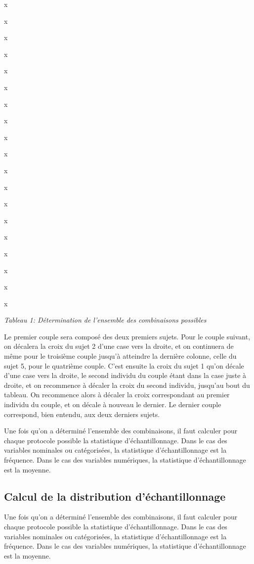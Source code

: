\documentclass[]{book}
\theoremstyle{definition}
\theoremstyle{definition}
\theoremstyle{definition}
\theoremstyle{remark}
\begin{document}
x

x

x

x

x

x

x

x

x

x

x

x

x

x

x

x

x

x

x

\emph{Tableau 1: Détermination de l'ensemble des combinaisons possibles}

Le premier couple sera composé des deux premiers sujets. Pour le couple
suivant, on décalera la croix du sujet 2 d'une case vers la droite, et
on continuera de même pour le troisième couple jusqu'à atteindre la
dernière colonne, celle du sujet 5, pour le quatrième couple. C'est
ensuite la croix du sujet 1 qu'on décale d'une case vers la droite, le
second individu du couple étant dans la case juste à droite, et on
recommence à décaler la croix du second individu, jusqu'au bout du
tableau. On recommence alors à décaler la croix correspondant au premier
individu du couple, et on décale à nouveau le dernier. Le dernier couple
correspond, bien entendu, aux deux derniers sujets.

Une fois qu'on a déterminé l'ensemble des combinaisons, il faut calculer
pour chaque protocole possible la statistique d'échantillonnage. Dans le
cas des variables nominales ou catégorisées, la statistique
d'échantillonnage est la fréquence. Dans le cas des variables
numériques, la statistique d'échantillonnage est la moyenne.

\hypertarget{calcul-de-la-distribution-dechantillonnage}{%
\subsection{Calcul de la distribution
d'échantillonnage}\label{calcul-de-la-distribution-dechantillonnage}}

Une fois qu'on a déterminé l'ensemble des combinaisons, il faut calculer
pour chaque protocole possible la statistique d'échantillonnage. Dans le
cas des variables nominales ou catégorisées, la statistique
d'échantillonnage est la fréquence. Dans le cas des variables
numériques, la statistique d'échantillonnage est la moyenne.
\end{document}

